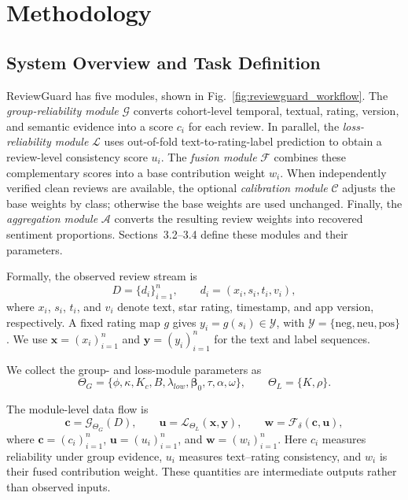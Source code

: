 \documentclass[runningheads]{llncs}
\begin{document}
\section{Methodology}

\subsection{System Overview and Task Definition}

ReviewGuard has five modules, shown in Fig.~\ref{fig:reviewguard_workflow}. The \emph{group-reliability module} \(\mathcal{G}\) converts cohort-level temporal, textual, rating, version, and semantic evidence into a score \(c_i\) for each review. In parallel, the \emph{loss-reliability module} \(\mathcal{L}\) uses out-of-fold text-to-rating-label prediction to obtain a review-level consistency score \(u_i\). The \emph{fusion module} \(\mathcal{F}\) combines these complementary scores into a base contribution weight \(w_i\). When independently verified clean reviews are available, the optional \emph{calibration module} \(\mathcal{C}\) adjusts the base weights by class; otherwise the base weights are used unchanged. Finally, the \emph{aggregation module} \(\mathcal{A}\) converts the resulting review weights into recovered sentiment proportions. Sections~3.2--3.4 define these modules and their parameters.

Formally, the observed review stream is
\[
D=\{d_i\}_{i=1}^{n}, \qquad d_i=(x_i,s_i,t_i,v_i),
\]
where \(x_i\), \(s_i\), \(t_i\), and \(v_i\) denote text, star rating, timestamp, and app version, respectively. A fixed rating map \(g\) gives \(y_i=g(s_i)\in\mathcal{Y}\), with \(\mathcal{Y}=\{\mathrm{neg},\mathrm{neu},\mathrm{pos}\}\). We use \(\mathbf{x}=(x_i)_{i=1}^{n}\) and \(\mathbf{y}=(y_i)_{i=1}^{n}\) for the text and label sequences.

We collect the group- and loss-module parameters as
\[
\Theta_G=\{\phi,\kappa,K_c,B,\lambda_{low},\boldsymbol{\beta}_0,
\tau,\alpha,\omega\},
\qquad
\Theta_L=\{K,\rho\}.
\]

The module-level data flow is
\begin{equation}
\mathbf{c}=\mathcal{G}_{\Theta_G}(D), \qquad
\mathbf{u}=\mathcal{L}_{\Theta_L}(\mathbf{x},\mathbf{y}), \qquad
\mathbf{w}=\mathcal{F}_{\delta}(\mathbf{c},\mathbf{u}),
\label{eq:reviewguard_base_flow}
\end{equation}
where \(\mathbf{c}=(c_i)_{i=1}^{n}\), \(\mathbf{u}=(u_i)_{i=1}^{n}\), and \(\mathbf{w}=(w_i)_{i=1}^{n}\). Here \(c_i\) measures reliability under group evidence, \(u_i\) measures text--rating consistency, and \(w_i\) is their fused contribution weight. These quantities are intermediate outputs rather than observed inputs.
\end{document}
